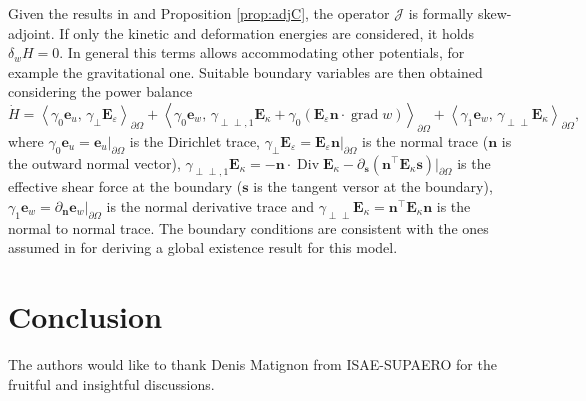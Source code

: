 \documentclass{ifacconf}
\DeclareMathOperator*{\grad}{grad}
\DeclareMathOperator*{\Div}{Div}
\newcommand{\inner}[3][]{\ensuremath{\left\langle #2, \, #3 \right\rangle_{#1}}}
\begin{document}
Given the results in \cite{brugnoli2019mindlin,brugnoli2019kirchhoff} and Proposition \ref{prop:adjC}, the operator $\mathcal{J}$ is formally skew-adjoint. If only the kinetic and deformation energies are considered, it holds $\delta_{w} H=0$. In general this terms allows accommodating other potentials, for example the gravitational one. Suitable boundary variables are then obtained considering the power balance
\begin{equation}
	\dot{H} = \inner[\partial\Omega]{\gamma_0\bm{e}_u}{\gamma_\perp \bm{E}_\varepsilon} + \inner[\partial\Omega]{\gamma_0\bm{e}_w}{\gamma_{\perp\perp, 1} \bm{E}_\kappa + \gamma_0(\bm{E}_\varepsilon \bm{n} \cdot \grad w)} + \inner[\partial\Omega]{\gamma_1\bm{e}_w}{\gamma_{\perp\perp} \bm{E}_\kappa},
\end{equation}
where $\gamma_0\bm{e}_u= \bm{e}_u\vert_{\partial\Omega}$ is the Dirichlet trace, $\gamma_\perp \bm{E}_\varepsilon = \bm{E}_\varepsilon \bm{n}\vert_{\partial\Omega}$ is the normal trace ($\bm{n}$ is the outward normal vector), $\gamma_{\perp\perp, 1} \bm{E}_\kappa = - \bm{n} \cdot \Div \bm{E}_\kappa - \partial_{\bm{s}}(\bm{n}^\top \bm{E}_\kappa \bm{s})\vert_{\partial\Omega}$ is the effective shear force at the boundary ($\bm{s}$ is the tangent versor at the boundary), $\gamma_1 \bm{e}_w = \partial_{\bm{n}} \bm{e}_w\vert_{\partial\Omega}$ is the normal derivative trace and $\gamma_{\perp\perp} \bm{E}_\kappa = \bm{n}^\top \bm{E}_\kappa \bm{n}$ is the normal to normal trace. The boundary conditions are consistent with the ones assumed in \cite{puel1996} for deriving a global existence result for this model.




\section{Conclusion}

\begin{ack}
The authors would like to thank Denis Matignon from ISAE-SUPAERO for the fruitful and insightful discussions.
\end{ack}

\appendix

      
\end{document}

